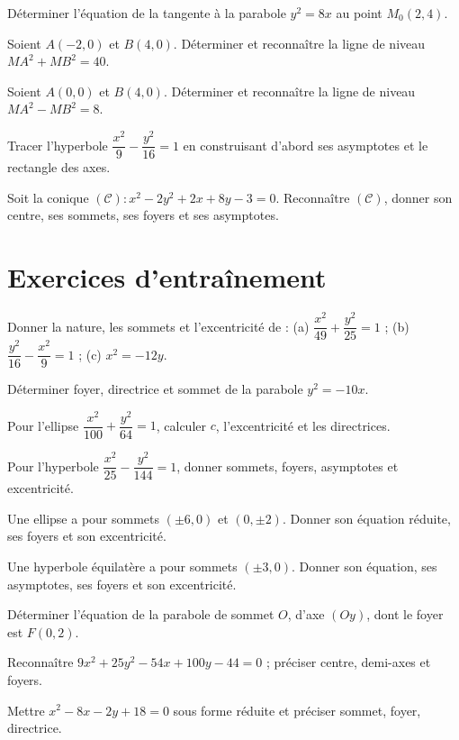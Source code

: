 \exo{} Déterminer l'équation de la tangente à la parabole $y^{2}=8x$ au point
$M_0(2,4)$.

\exo{} Soient $A(-2,0)$ et $B(4,0)$. Déterminer et reconnaître la ligne de niveau
$MA^{2}+MB^{2}=40$.

\exo{} Soient $A(0,0)$ et $B(4,0)$. Déterminer et reconnaître la ligne de niveau
$MA^{2}-MB^{2}=8$.

\exo{} Tracer l'hyperbole $\dfrac{x^{2}}{9}-\dfrac{y^{2}}{16}=1$ en construisant
d'abord ses asymptotes et le rectangle des axes.

\exo{} Soit la conique $(\mathcal C):x^{2}-2y^{2}+2x+8y-3=0$. Reconnaître
$(\mathcal C)$, donner son centre, ses sommets, ses foyers et ses asymptotes.

\section{Exercices d'entraînement}

\exo{} Donner la nature, les sommets et l'excentricité de :
(a) $\dfrac{x^{2}}{49}+\dfrac{y^{2}}{25}=1$ ; (b) $\dfrac{y^{2}}{16}-\dfrac{x^{2}}{9}=1$ ;
(c) $x^{2}=-12y$.

\exo{} Déterminer foyer, directrice et sommet de la parabole $y^{2}=-10x$.

\exo{} Pour l'ellipse $\dfrac{x^{2}}{100}+\dfrac{y^{2}}{64}=1$, calculer $c$,
l'excentricité et les directrices.

\exo{} Pour l'hyperbole $\dfrac{x^{2}}{25}-\dfrac{y^{2}}{144}=1$, donner sommets,
foyers, asymptotes et excentricité.

\exo{} Une ellipse a pour sommets $(\pm6,0)$ et $(0,\pm2)$. Donner son équation
réduite, ses foyers et son excentricité.

\exo{} Une hyperbole équilatère a pour sommets $(\pm3,0)$. Donner son équation,
ses asymptotes, ses foyers et son excentricité.

\exo{} Déterminer l'équation de la parabole de sommet $O$, d'axe $(Oy)$, dont le
foyer est $F(0,2)$.

\exo{} Reconnaître $9x^{2}+25y^{2}-54x+100y-44=0$ ; préciser centre, demi-axes et
foyers.

\exo{} Mettre $x^{2}-8x-2y+18=0$ sous forme réduite et préciser sommet, foyer,
directrice.

